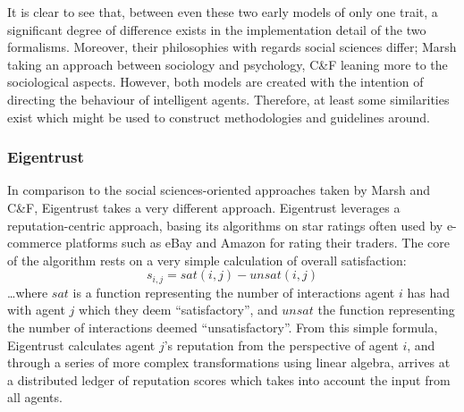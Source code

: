 It is clear to see that, between even these two early models of only one trait, a significant degree of difference exists in the implementation detail of the two formalisms. Moreover, their philosophies with regards social sciences differ; Marsh taking an approach between sociology and psychology, C\&F leaning more to the sociological aspects. However, both models are created with the intention of directing the behaviour of intelligent agents. Therefore, at least some similarities exist which might be used to construct methodologies and guidelines around.\par

\subsubsection*{Eigentrust}\label{sec:eigentrust}
In comparison to the social sciences-oriented approaches taken by Marsh and C\&F, Eigentrust\cite{Kamvar2003} takes a very different approach. Eigentrust leverages a reputation-centric approach, basing its algorithms on star ratings often used by e-commerce platforms such as eBay and Amazon for rating their traders. The core of the algorithm rests on a very simple calculation of overall satisfaction:
\[s_{i, j} = sat(i, j) - unsat(i, j)\]
\ldots{}where \(sat\) is a function representing the number of interactions agent \(i\) has had with agent \(j\) which they deem ``satisfactory'', and \(unsat\) the function representing the number of interactions deemed ``unsatisfactory''. From this simple formula, Eigentrust calculates agent \(j\)'s reputation from the perspective of agent \(i\), and through a series of more complex transformations using linear algebra, arrives at a distributed ledger of reputation scores which takes into account the input from all agents.\par

